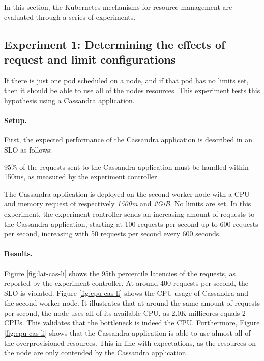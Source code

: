 In this section, the Kubernetes mechanisms for resource management are evaluated through a series of experiments. 

\subsection{Experiment 1: Determining the effects of request and limit configurations}
If there is just one pod scheduled on a node, and if that pod has no limits set, then it should be able to use all of the nodes resources. This experiment tests this hypothesis using a Cassandra application.

\paragraph{Setup.}
First, the expected performance of the Cassandra application is described in an SLO as follows:

\begin{slo}
95\% of the requests sent to the Cassandra application must be handled within 150ms, as measured by the experiment controller.
\end{slo}

The Cassandra application is deployed on the second worker node with a CPU and memory request of respectively \textit{1500m} and \textit{2GiB}. No limits are set. In this experiment, the experiment controller sends an increasing amount of requests to the Cassandra application, starting at 100 requests per second up to 600 requests per second, increasing with 50 requests per second every 600 seconds. 

\paragraph{Results.}
Figure \ref{fig:lat-cas-li} shows the 95th percentile latencies of the requests, as reported by the experiment controller. At around 400 requests per second, the SLO is violated. Figure \ref{fig:cpu-cas-li} shows the CPU usage of Cassandra and the second worker node. It illustrates that at around the same amount of requests per second, the node uses all of its available CPU, as 2.0K millicores equals 2 CPUs. This validates that the bottleneck is indeed the CPU. Furthermore, Figure \ref{fig:cpu-cas-li} shows that the Cassandra application is able to use almost all of the overprovisioned resources. This in line with expectations, as the resources on the node are only contended by the Cassandra application.

